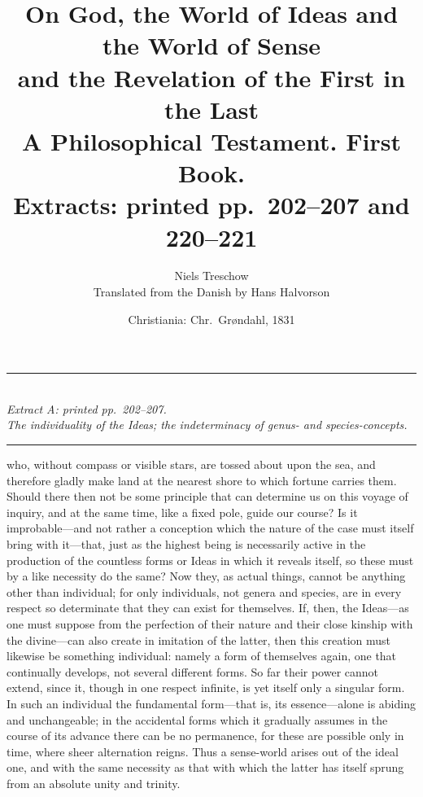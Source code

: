 \documentclass[12pt,a4paper]{article}
\title{\textbf{On God, the World of Ideas and the World of Sense}\\[4pt]
  \large and the Revelation of the First in the Last\\[6pt]
  \normalsize A Philosophical Testament. First Book.\\[8pt]
  \large Extracts: printed pp.\ 202--207 and 220--221}
\author{Niels Treschow\\[4pt]
  \small Translated from the Danish by Hans Halvorson}
\date{\small Christiania: Chr.\ Grøndahl, 1831}
\newcommand{\spanhead}[1]{%
  \bigskip\begin{center}\rule{0.18\linewidth}{0.4pt}\\[6pt]
  {\small\itshape #1}\\[4pt]\rule{0.18\linewidth}{0.4pt}\end{center}\smallskip}
\begin{document}
\maketitle
\thispagestyle{fancy}

\bigskip

\spanhead{Extract A: printed pp.\ 202--207.\\
  The individuality of the Ideas; the indeterminacy of genus- and
  species-concepts.}

\noindent
[\dots] who, without compass or visible stars, are tossed about upon the sea, and
therefore gladly make land at the nearest shore to which fortune carries them.
Should there then not be some principle that can determine us on this voyage of
inquiry, and at the same time, like a fixed pole, guide our course? Is it
improbable---and not rather a conception which the nature of the case must itself
bring with it---that, just as the highest being is necessarily active in the
production of the countless forms or Ideas in which it reveals itself, so these
must by a like necessity do the same? Now they, as actual things, cannot be
anything other than individual; for only individuals, not genera and species, are
in every respect so determinate that they can exist for themselves. If, then, the
Ideas---as one must suppose from the perfection of their nature and their close
kinship with the divine---can also create in imitation of the latter, then this
creation must likewise be something individual: namely a form of themselves again,
one that continually develops, not several different forms. So far their power
cannot extend, since it, though in one respect infinite, is yet itself only a
singular form. In such an individual the fundamental form---that is, its
essence---alone is abiding and unchangeable; in the accidental forms which it
gradually assumes in the course of its advance there can be no permanence, for
these are possible only in time, where
sheer alternation reigns. Thus a sense-world arises out of the ideal one, and with
the same necessity as that with which the latter has itself sprung from an
absolute unity and trinity.
\end{document}
